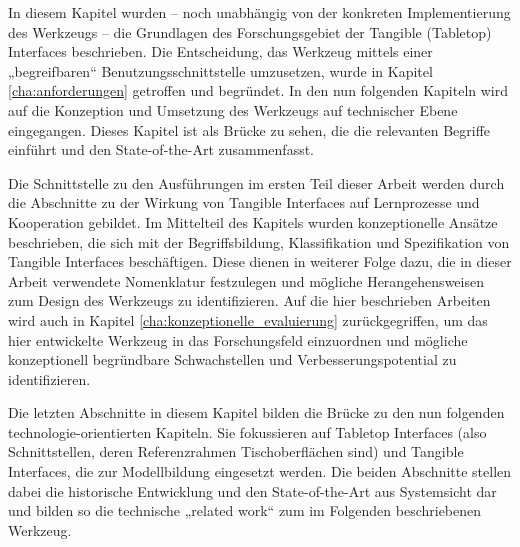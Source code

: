 In diesem Kapitel wurden -- noch unabhängig von der konkreten Implementierung des Werkzeugs -- die Grundlagen des Forschungsgebiet der Tangible (Tabletop) Interfaces beschrieben. Die Entscheidung, das Werkzeug mittels einer „begreifbaren“ Benutzungsschnittstelle umzusetzen, wurde in Kapitel \ref{cha:anforderungen} getroffen und begründet. In den nun folgenden Kapiteln wird auf die Konzeption und Umsetzung des Werkzeugs auf technischer Ebene eingegangen. Dieses Kapitel ist als Brücke zu sehen, die die relevanten Begriffe einführt und den State-of-the-Art zusammenfasst.

Die Schnittstelle zu den Ausführungen im ersten Teil dieser Arbeit werden durch die Abschnitte zu der Wirkung von Tangible Interfaces auf Lernprozesse und Kooperation gebildet. Im Mittelteil des Kapitels wurden konzeptionelle Ansätze beschrieben, die sich mit der Begriffsbildung, Klassifikation und Spezifikation von Tangible Interfaces beschäftigen. Diese dienen in weiterer Folge dazu, die in dieser Arbeit verwendete Nomenklatur festzulegen und mögliche Herangehensweisen zum Design des Werkzeugs zu identifizieren. Auf die hier beschrieben Arbeiten wird auch in Kapitel \ref{cha:konzeptionelle_evaluierung} zurückgegriffen, um das hier entwickelte Werkzeug in das Forschungsfeld einzuordnen und mögliche konzeptionell begründbare Schwachstellen und Verbesserungspotential zu identifizieren.

Die letzten Abschnitte in diesem Kapitel bilden die Brücke zu den nun folgenden technologie-orientierten Kapiteln. Sie fokussieren auf Tabletop Interfaces (also Schnittstellen, deren Referenzrahmen Tischoberflächen sind) und Tangible Interfaces, die zur Modellbildung eingesetzt werden. Die beiden Abschnitte stellen dabei die historische Entwicklung und den State-of-the-Art aus Systemsicht dar und bilden so die technische „related work“ zum im Folgenden beschriebenen Werkzeug. 


